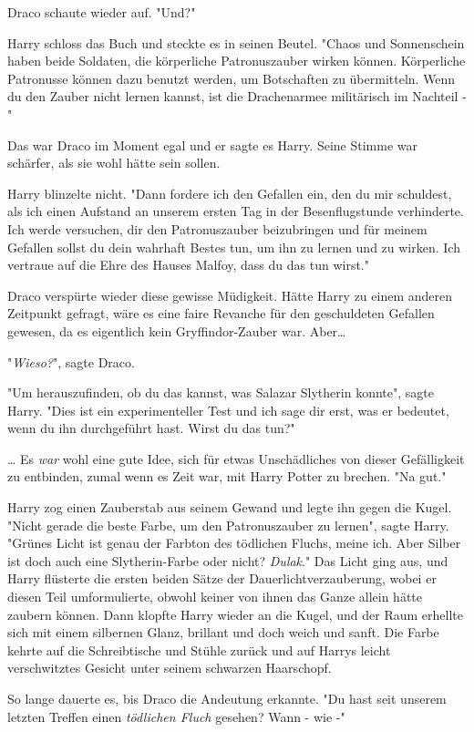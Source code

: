 {Draco schaute wieder auf. "Und?"

Harry schloss das Buch und steckte es in seinen Beutel. "Chaos und Sonnenschein haben beide Soldaten, die körperliche Patronuszauber wirken können. Körperliche Patronusse können dazu benutzt werden, um Botschaften zu übermitteln. Wenn du den Zauber nicht lernen kannst, ist die Drachenarmee militärisch im Nachteil -"

Das war Draco im Moment egal und er sagte es Harry. Seine Stimme war schärfer, als sie wohl hätte sein sollen.

Harry blinzelte nicht. "Dann fordere ich den Gefallen ein, den du mir schuldest, als ich einen Aufstand an unserem ersten Tag in der Besenflugstunde verhinderte. Ich werde versuchen, dir den Patronuszauber beizubringen und für meinem Gefallen sollst du dein wahrhaft Bestes tun, um ihn zu lernen und zu wirken. Ich vertraue auf die Ehre des Hauses Malfoy, dass du das tun wirst."

Draco verspürte wieder diese gewisse Müdigkeit. Hätte Harry zu einem anderen Zeitpunkt gefragt, wäre es eine faire Revanche für den geschuldeten Gefallen gewesen, da es eigentlich kein Gryffindor-Zauber war. Aber…

"\emph{Wieso?}", sagte Draco.

"Um herauszufinden, ob du das kannst, was Salazar Slytherin konnte", sagte Harry. "Dies ist ein experimenteller Test und ich sage dir erst, was er bedeutet, wenn du ihn durchgeführt hast. Wirst du das tun?"

… Es \emph{war} wohl eine gute Idee, sich für etwas Unschädliches von dieser Gefälligkeit zu entbinden, zumal wenn es Zeit war, mit Harry Potter zu brechen. "Na gut."

Harry zog einen Zauberstab aus seinem Gewand und legte ihn gegen die Kugel. "Nicht gerade die beste Farbe, um den Patronuszauber zu lernen", sagte Harry. "Grünes Licht ist genau der Farbton des tödlichen Fluchs, meine ich. Aber Silber ist doch auch eine Slytherin-Farbe oder nicht? \emph{Dulak}." Das Licht ging aus, und Harry flüsterte die ersten beiden Sätze der Dauerlichtverzauberung, wobei er diesen Teil umformulierte, obwohl keiner von ihnen das Ganze allein hätte zaubern können. Dann klopfte Harry wieder an die Kugel, und der Raum erhellte sich mit einem silbernen Glanz, brillant und doch weich und sanft. Die Farbe kehrte auf die Schreibtische und Stühle zurück und auf Harrys leicht verschwitztes Gesicht unter seinem schwarzen Haarschopf.

So lange dauerte es, bis Draco die Andeutung erkannte. "Du hast seit unserem letzten Treffen einen \emph{tödlichen Fluch} gesehen? Wann - wie -"

}
